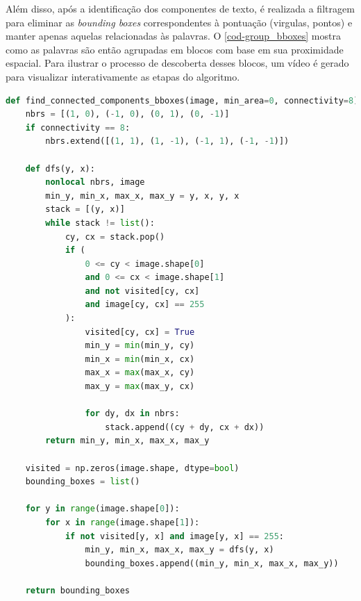 \documentclass[english, 
               brazil, 
               bsc] %
               {dcomp-abntex2}
\begin{document}
Além disso, após a identificação dos componentes de texto, é realizada a filtragem para eliminar as \textit{bounding boxes} correspondentes à pontuação (virgulas, pontos) e manter apenas aquelas relacionadas às palavras. O \autoref{cod-group_bboxes} mostra como as palavras são então agrupadas em blocos com base em sua proximidade espacial. Para ilustrar  o processo de descoberta desses blocos, um vídeo é gerado para visualizar interativamente as etapas do algoritmo. 

\begin{codigo}[h]
  \caption{\small .}
 \label{cod-findcomp}
\begin{lstlisting}[language=python]
def find_connected_components_bboxes(image, min_area=0, connectivity=8):
    nbrs = [(1, 0), (-1, 0), (0, 1), (0, -1)]
    if connectivity == 8:
        nbrs.extend([(1, 1), (1, -1), (-1, 1), (-1, -1)])

    def dfs(y, x):
        nonlocal nbrs, image
        min_y, min_x, max_x, max_y = y, x, y, x
        stack = [(y, x)]
        while stack != list():
            cy, cx = stack.pop()
            if (
                0 <= cy < image.shape[0]
                and 0 <= cx < image.shape[1]
                and not visited[cy, cx]
                and image[cy, cx] == 255
            ):
                visited[cy, cx] = True
                min_y = min(min_y, cy)
                min_x = min(min_x, cx)
                max_x = max(max_x, cy)
                max_y = max(max_y, cx)

                for dy, dx in nbrs:
                    stack.append((cy + dy, cx + dx))
        return min_y, min_x, max_x, max_y

    visited = np.zeros(image.shape, dtype=bool)
    bounding_boxes = list()

    for y in range(image.shape[0]):
        for x in range(image.shape[1]):
            if not visited[y, x] and image[y, x] == 255:
                min_y, min_x, max_x, max_y = dfs(y, x)
                bounding_boxes.append((min_y, min_x, max_x, max_y))

    return bounding_boxes

\end{lstlisting}
\end{codigo}
\end{document}
